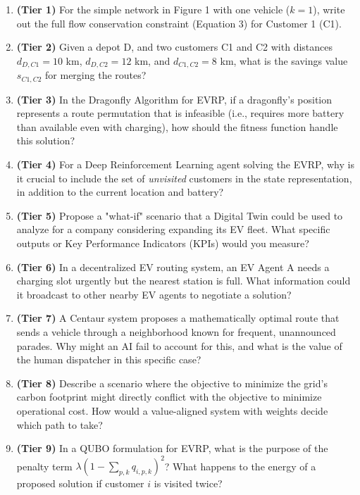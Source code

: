 \documentclass{article}
\begin{document}
\begin{enumerate}[label=\textbf{Q\arabic*.}, wide, labelwidth=!, labelindent=0pt]
    \item \textbf{(Tier 1)} For the simple network in Figure 1 with one vehicle ($k=1$), write out the full flow conservation constraint (Equation 3) for Customer 1 (C1).
    \item \textbf{(Tier 2)} Given a depot D, and two customers C1 and C2 with distances $d_{D,C1}=10$ km, $d_{D,C2}=12$ km, and $d_{C1,C2}=8$ km, what is the savings value $s_{C1,C2}$ for merging the routes?
    \item \textbf{(Tier 3)} In the Dragonfly Algorithm for EVRP, if a dragonfly's position represents a route permutation that is infeasible (i.e., requires more battery than available even with charging), how should the fitness function handle this solution?
    \item \textbf{(Tier 4)} For a Deep Reinforcement Learning agent solving the EVRP, why is it crucial to include the set of \emph{unvisited} customers in the state representation, in addition to the current location and battery?
    \item \textbf{(Tier 5)} Propose a "what-if" scenario that a Digital Twin could be used to analyze for a company considering expanding its EV fleet. What specific outputs or Key Performance Indicators (KPIs) would you measure?
    \item \textbf{(Tier 6)} In a decentralized EV routing system, an EV Agent A needs a charging slot urgently but the nearest station is full. What information could it broadcast to other nearby EV agents to negotiate a solution?
    \item \textbf{(Tier 7)} A Centaur system proposes a mathematically optimal route that sends a vehicle through a neighborhood known for frequent, unannounced parades. Why might an AI fail to account for this, and what is the value of the human dispatcher in this specific case?
    \item \textbf{(Tier 8)} Describe a scenario where the objective to minimize the grid's carbon footprint might directly conflict with the objective to minimize operational cost. How would a value-aligned system with weights decide which path to take?
    \item \textbf{(Tier 9)} In a QUBO formulation for EVRP, what is the purpose of the penalty term $\lambda \left(1 - \sum_{p,k} q_{i,p,k}\right)^2$? What happens to the energy of a proposed solution if customer $i$ is visited twice?
\end{enumerate}
\end{document}
